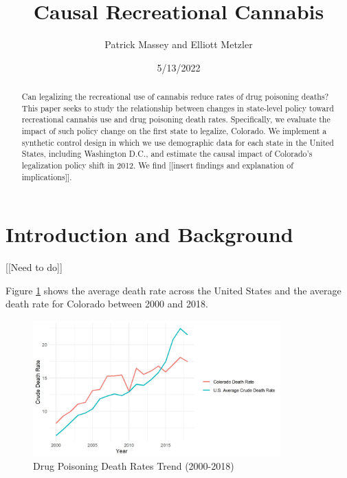 \documentclass{article}
\author{Patrick Massey and Elliott Metzler}
\title{Causal Recreational Cannabis}
\date{5/13/2022}
\begin{document}
\maketitle

\begin{abstract}

Can legalizing the recreational use of cannabis reduce rates of drug poisoning deaths? This paper seeks to study the relationship between changes in state-level policy toward recreational cannabis use and drug poisoning death rates. Specifically, we evaluate the impact of such policy change on the first state to legalize, Colorado. We implement a synthetic control design in which we use demographic data for each state in the United States, including Washington D.C., and estimate the causal impact of Colorado's legalization policy shift in 2012. We find [[insert findings and explanation of implications]].

\end{abstract}

\newpage

\section{Introduction and Background}

[[Need to do]]



Figure \ref{fig:death_rates_trend} shows the average death rate across the United States and the average death rate for Colorado between 2000 and 2018.
\begin{figure}[H]
	\begin{center}
		\includegraphics[width=0.85\textwidth]{death_Rates_trend}
	\end{center}
	\caption{Drug Poisoning Death Rates Trend (2000-2018)}
	\label{fig:death_rates_trend}
\end{figure}
\end{document}
